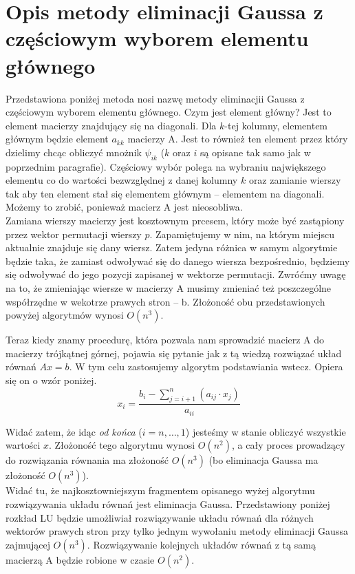 \documentclass[]{article}
\begin{document}
	\section*{Opis metody eliminacji Gaussa z częściowym wyborem elementu głównego}
	Przedstawiona poniżej metoda nosi nazwę metody eliminacjii Gaussa z częściowym wyborem elementu głównego.
	Czym jest element główny? Jest to element macierzy znajdujący się na diagonali. Dla $k$-tej kolumny, elementem głównym będzie element $a_{kk}$ macierzy A. Jest to również ten element przez który dzielimy chcąc obliczyć mnożnik $\psi_{ik}$ ($k$ oraz $i$ są opisane tak samo jak w poprzednim paragrafie). Częściowy wybór polega na wybraniu największego elementu co do wartości bezwzględnej z danej kolumny $k$ oraz zamianie wierszy tak aby ten element stał się elementem głównym -- elementem na diagonali. Możemy to zrobić, ponieważ macierz A jest nieosobliwa. \\
	Zamiana wierszy macierzy jest kosztownym prcesem, który może być zastąpiony przez wektor permutacji wierszy $p$. Zapamiętujemy w nim, na którym miejscu aktualnie znajduje się dany wiersz. Zatem jedyna różnica w samym algorytmie będzie taka, że zamiast odwoływać się do danego wiersza bezpośrednio, będziemy się odwoływać do jego pozycji zapisanej w wektorze permutacji. Zwróćmy uwagę na to, że zmieniając wiersze w macierzy A musimy zmieniać też poszczególne współrzędne w wekotrze prawych stron -- b. Złożoność obu przedstawionych powyżej algorytmów wynosi $O(n^3)$.
	
	Teraz kiedy znamy procedurę, która pozwala nam sprowadzić macierz A do macierzy trójkątnej górnej, pojawia się pytanie jak z tą wiedzą rozwiązać układ równań $Ax = b$. W tym celu zastosujemy algorytm podstawiania wstecz. Opiera się on o wzór poniżej.
	$$x_i = \frac{b_i - \sum_{j = i+1}^n (a_{ij} \cdot x_j)}{a_{ii}}$$
	
	Widać zatem, że idąc \textit{od końca} ($i=n,\ldots,1$) jesteśmy w stanie obliczyć wszystkie wartości $x$. Złożoność tego algorytmu wynosi $O(n^2)$, a cały proces prowadzący do rozwiązania równania ma złożoność $O(n^3)$ (bo eliminacja Gaussa ma złożoność $O(n^3)$). \\
	Widać tu, że najkosztowniejszym fragmentem opisanego wyżej algorytmu rozwiązywania układu równań jest eliminacja Gaussa. Przedstawiony poniżej rozkład LU będzie umożliwiał rozwiązywanie układu równań dla różnych wektorów prawych stron przy tylko jednym wywołaniu metody eliminacji Gaussa zajmującej $O(n^3)$. Rozwiązywanie kolejnych układów równań z tą samą macierzą A będzie robione w czasie $O(n^2)$.
	\clearpage
\end{document}

